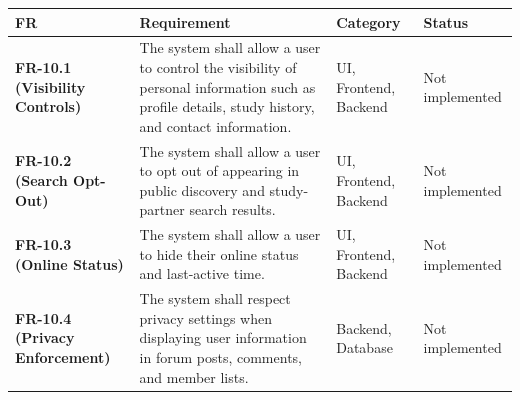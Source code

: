 \documentclass[12pt]{article}
\renewcommand{\baselinestretch}{1.5}
\begin{document}
\begingroup
\small
\renewcommand{\baselinestretch}{1.0}\selectfont
\renewcommand{\arraystretch}{1.15}
\setlength{\tabcolsep}{6pt}
\begin{longtable}{|>{\raggedright\arraybackslash}p{}|>{\raggedright\arraybackslash}p{}|>{\raggedright\arraybackslash}p{}|>{\raggedright\arraybackslash}p{}|}
\hline
\textbf{FR} & \textbf{Requirement} & \textbf{Category} & \textbf{Status} \\ \hline
\endhead
\textbf{FR-10.1 (Visibility Controls)} & The system shall allow a user to control the visibility of personal information such as profile details, study history, and contact information. & UI, Frontend, Backend & Not implemented \\ \hline
\textbf{FR-10.2 (Search Opt-Out)} & The system shall allow a user to opt out of appearing in public discovery and study-partner search results. & UI, Frontend, Backend & Not implemented \\ \hline
\textbf{FR-10.3 (Online Status)} & The system shall allow a user to hide their online status and last-active time. & UI, Frontend, Backend & Not implemented \\ \hline
\textbf{FR-10.4 (Privacy Enforcement)} & The system shall respect privacy settings when displaying user information in forum posts, comments, and member lists. & Backend, Database & Not implemented \\ \hline
\end{longtable}
\endgroup
\par\medskip

\par\medskip
\hypertarget{sec:ui-prototype-specimens}{}
\end{document}
